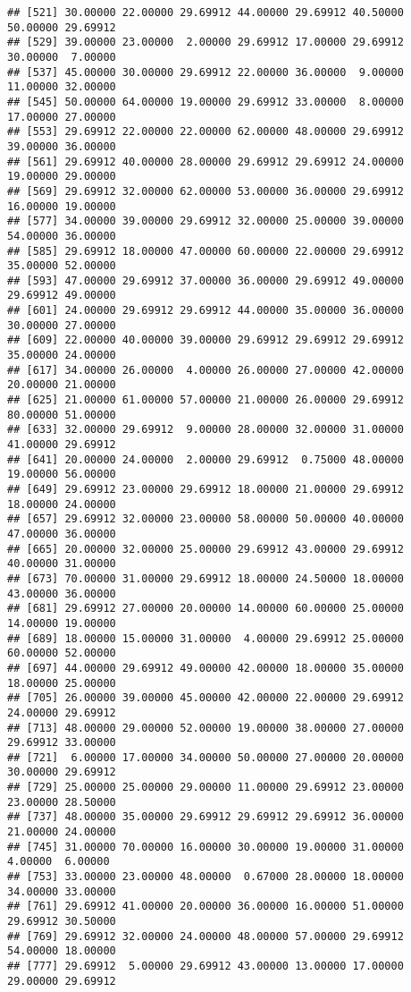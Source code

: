 \documentclass[
]{article}
\begin{document}
\begin{verbatim}
## [521] 30.00000 22.00000 29.69912 44.00000 29.69912 40.50000 50.00000 29.69912
## [529] 39.00000 23.00000  2.00000 29.69912 17.00000 29.69912 30.00000  7.00000
## [537] 45.00000 30.00000 29.69912 22.00000 36.00000  9.00000 11.00000 32.00000
## [545] 50.00000 64.00000 19.00000 29.69912 33.00000  8.00000 17.00000 27.00000
## [553] 29.69912 22.00000 22.00000 62.00000 48.00000 29.69912 39.00000 36.00000
## [561] 29.69912 40.00000 28.00000 29.69912 29.69912 24.00000 19.00000 29.00000
## [569] 29.69912 32.00000 62.00000 53.00000 36.00000 29.69912 16.00000 19.00000
## [577] 34.00000 39.00000 29.69912 32.00000 25.00000 39.00000 54.00000 36.00000
## [585] 29.69912 18.00000 47.00000 60.00000 22.00000 29.69912 35.00000 52.00000
## [593] 47.00000 29.69912 37.00000 36.00000 29.69912 49.00000 29.69912 49.00000
## [601] 24.00000 29.69912 29.69912 44.00000 35.00000 36.00000 30.00000 27.00000
## [609] 22.00000 40.00000 39.00000 29.69912 29.69912 29.69912 35.00000 24.00000
## [617] 34.00000 26.00000  4.00000 26.00000 27.00000 42.00000 20.00000 21.00000
## [625] 21.00000 61.00000 57.00000 21.00000 26.00000 29.69912 80.00000 51.00000
## [633] 32.00000 29.69912  9.00000 28.00000 32.00000 31.00000 41.00000 29.69912
## [641] 20.00000 24.00000  2.00000 29.69912  0.75000 48.00000 19.00000 56.00000
## [649] 29.69912 23.00000 29.69912 18.00000 21.00000 29.69912 18.00000 24.00000
## [657] 29.69912 32.00000 23.00000 58.00000 50.00000 40.00000 47.00000 36.00000
## [665] 20.00000 32.00000 25.00000 29.69912 43.00000 29.69912 40.00000 31.00000
## [673] 70.00000 31.00000 29.69912 18.00000 24.50000 18.00000 43.00000 36.00000
## [681] 29.69912 27.00000 20.00000 14.00000 60.00000 25.00000 14.00000 19.00000
## [689] 18.00000 15.00000 31.00000  4.00000 29.69912 25.00000 60.00000 52.00000
## [697] 44.00000 29.69912 49.00000 42.00000 18.00000 35.00000 18.00000 25.00000
## [705] 26.00000 39.00000 45.00000 42.00000 22.00000 29.69912 24.00000 29.69912
## [713] 48.00000 29.00000 52.00000 19.00000 38.00000 27.00000 29.69912 33.00000
## [721]  6.00000 17.00000 34.00000 50.00000 27.00000 20.00000 30.00000 29.69912
## [729] 25.00000 25.00000 29.00000 11.00000 29.69912 23.00000 23.00000 28.50000
## [737] 48.00000 35.00000 29.69912 29.69912 29.69912 36.00000 21.00000 24.00000
## [745] 31.00000 70.00000 16.00000 30.00000 19.00000 31.00000  4.00000  6.00000
## [753] 33.00000 23.00000 48.00000  0.67000 28.00000 18.00000 34.00000 33.00000
## [761] 29.69912 41.00000 20.00000 36.00000 16.00000 51.00000 29.69912 30.50000
## [769] 29.69912 32.00000 24.00000 48.00000 57.00000 29.69912 54.00000 18.00000
## [777] 29.69912  5.00000 29.69912 43.00000 13.00000 17.00000 29.00000 29.69912

\end{verbatim}
\end{document}
